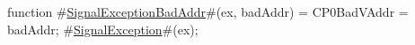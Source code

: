 function  #\hyperref[zSignalExceptionBadAddr]{SignalExceptionBadAddr}#(ex, badAddr) =
  {
    CP0BadVAddr = badAddr;
    #\hyperref[zSignalException]{SignalException}#(ex);
  }
